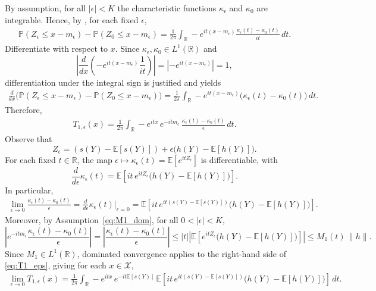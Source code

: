 \documentclass[12pt,leqno]{amsart}
\begin{document}
By assumption, for all $|\epsilon|<K$ the characteristic functions $\kappa_\epsilon$ and $\kappa_0$ are integrable.
Hence, by \cite[Lemma~3.4.19]{durrett2019probability}, for each fixed $\epsilon$,
\begin{align*}
\mathbb P(Z_\epsilon\le x-m_\epsilon)-\mathbb P(Z_0\le x-m_\epsilon)
=\frac{1}{2\pi}\int_{\mathbb R}-e^{it(x-m_\epsilon)}\frac{\kappa_\epsilon(t)-\kappa_0(t)}{it}\,dt.
\end{align*}
Differentiate with respect to $x$. Since $\kappa_\epsilon,\kappa_0\in L^1(\mathbb R)$ and
\[
\left|\frac{d}{dx}\left(-e^{it(x-m_\epsilon)}\frac{1}{it}\right)\right|
=\left| -e^{it(x-m_\epsilon)}\right|=1,
\]
differentiation under the integral sign is justified and yields
\begin{align*}
\frac{d}{dx}\Big(\mathbb P(Z_\epsilon\le x-m_\epsilon)-\mathbb P(Z_0\le x-m_\epsilon)\Big)
=
\frac{1}{2\pi}\int_{\mathbb R}-e^{it(x-m_\epsilon)}\big(\kappa_\epsilon(t)-\kappa_0(t)\big)\,dt.
\end{align*}
Therefore,
\begin{align}\label{eq:T1_eps}
T_{1,\epsilon}(x)
=\frac{1}{2\pi}\int_{\mathbb R}-e^{itx}\,e^{-itm_\epsilon}\,\frac{\kappa_\epsilon(t)-\kappa_0(t)}{\epsilon}\,dt.
\end{align}
Observe that
\[
Z_\epsilon
= (s(Y)-\mathbb E[s(Y)])+\epsilon\big(h(Y)-\mathbb E[h(Y)]\big).
\]
For each fixed $t\in\mathbb R$, the map $\epsilon\mapsto \kappa_\epsilon(t)=\mathbb E[e^{itZ_\epsilon}]$ is
differentiable, with
\[
\frac{d}{d\epsilon}\kappa_\epsilon(t)
=
\mathbb E\!\left[it\,e^{itZ_\epsilon}\big(h(Y)-\mathbb E[h(Y)]\big)\right].
\]
In particular,
\begin{align}\label{eq:kappa_derivative_at0}
\lim_{\epsilon\to 0}\frac{\kappa_\epsilon(t)-\kappa_0(t)}{\epsilon}
=\frac{d}{d\epsilon}\kappa_\epsilon(t)\Big|_{\epsilon=0}
=
\mathbb E\!\left[it\,e^{it(s(Y)-\mathbb E[s(Y)])}\big(h(Y)-\mathbb E[h(Y)]\big)\right].
\end{align}
Moreover, by Assumption~\eqref{eq:M1_dom}, for all $0<|\epsilon|<K$,
\[
\left|e^{-itm_\epsilon}\frac{\kappa_\epsilon(t)-\kappa_0(t)}{\epsilon}\right|
=\left|\frac{\kappa_\epsilon(t)-\kappa_0(t)}{\epsilon}\right|
\le
|t|\left|\mathbb E\!\left[e^{itZ_\epsilon}\big(h(Y)-\mathbb E[h(Y)]\big)\right]\right|
\le M_1(t)\,\|h\|.
\]
Since $M_1\in L^1(\mathbb R)$, dominated convergence applies to the right-hand side of
\eqref{eq:T1_eps}, giving for each $x\in\mathcal{X}$,
\begin{align}\label{eq:T1_limit}
\lim_{\epsilon\to 0}T_{1,\epsilon}(x)
=
\frac{1}{2\pi}\int_{\mathbb R}-e^{itx}\,e^{-it\mathbb E[s(Y)]}\,
\mathbb E\!\left[it\,e^{it(s(Y)-\mathbb E[s(Y)])}\big(h(Y)-\mathbb E[h(Y)]\big)\right]\,dt.
\end{align}
\end{document}
